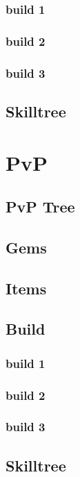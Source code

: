 \documentclass[14pt]{article}
\begin{document}
\subsubsection{build 1}
\subsubsection{build 2}
\subsubsection{build 3}
\subsection{Skilltree}

\newpage

\section{PvP}
\subsection{PvP Tree}
\subsection{Gems}
\subsection{Items}
\subsection{Build}
\subsubsection{build 1}
\subsubsection{build 2}
\subsubsection{build 3}
\subsection{Skilltree}

\newpage
\end{document}
